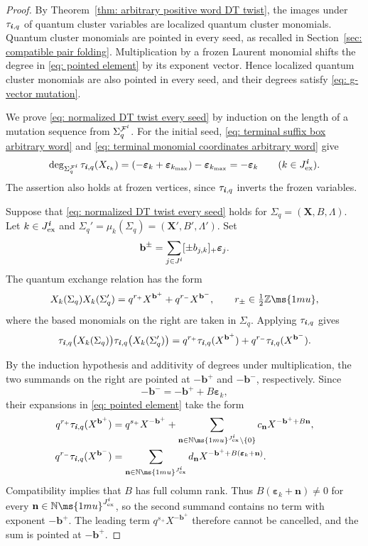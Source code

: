 \documentclass[12pt, leqno]{amsart}
\numberwithin{equation}{section}
\theoremstyle{plain}
\theoremstyle{definition}
\newcommand{\ex}{\mathrm{ex}}
\newcommand{\Z}{\mathbb{Z}\ms{1mu}}
\newcommand{\N}{\mathbb{N}\ms{1mu}}
\newcommand{\ve}{\boldsymbol{\varepsilon}}
\newcommand{\ii}{ \textbf{\textit{i}}}
\newcommand{\frakc}{\mathfrak{c}}
\newcommand{\bfX}{\mathbf{X}}
\newcommand{\bfb}{\mathbf{b}}
\newcommand{\bfn}{\mathbf{n}}
\newcommand{\calF}{\mathcal{F}}
\begin{document}
\begin{proof}
By Theorem~\ref{thm: arbitrary positive word DT twist}, the
images under $\tau_{\ii,q}$ of quantum cluster variables are
localized quantum cluster monomials.
Quantum cluster monomials are pointed in every seed, as recalled
in Section~\ref{sec: compatible pair folding}.
Multiplication by a frozen Laurent monomial shifts the degree in
\eqref{eq: pointed element} by its exponent vector.
Hence localized quantum cluster monomials are also pointed in
every seed, and their degrees satisfy \eqref{eq: g-vector mutation}.

We prove \eqref{eq: normalized DT twist every seed} by induction
on the length of a mutation sequence from $\Sigma_q^{\calF^\ii}$.
For the initial seed, \eqref{eq: terminal suffix box arbitrary word}
and \eqref{eq: terminal monomial coordinates arbitrary word} give
\[
\deg_{\Sigma_q^{\calF^\ii}}
\tau_{\ii,q}(X_{\frakc_k})
=
(-\ve_k+\ve_{k_{\max}})-\ve_{k_{\max}}
=
-\ve_k
\qquad(k\in J^\ii_\ex).
\]
The assertion also holds at frozen vertices, since
$\tau_{\ii,q}$ inverts the frozen variables.

Suppose that \eqref{eq: normalized DT twist every seed} holds
for $\Sigma_q=(\bfX,B,\Lambda)$.
Let $k\in J^\ii_\ex$ and
$\Sigma_q'=\mu_k(\Sigma_q)=(\bfX',B',\Lambda')$.
Set
\[
\bfb^\pm
=\sum_{j\in J^\ii}[\pm b_{j,k}]_+\ve_j.
\]
The quantum exchange relation has the form
\[
X_k(\Sigma_q)X_k(\Sigma_q')
=
q^{r_+}X^{\bfb^+}
+
q^{r_-}X^{\bfb^-},
\qquad
r_\pm\in\tfrac12\Z,
\]
where the based monomials on the right are taken in $\Sigma_q$.
Applying $\tau_{\ii,q}$ gives
\[
\begin{aligned}
\tau_{\ii,q}\bigl(X_k(\Sigma_q)\bigr)  \tau_{\ii,q}\bigl(X_k(\Sigma_q')\bigr) 
= q^{r_+}\tau_{\ii,q}(X^{\bfb^+}) + q^{r_-}\tau_{\ii,q}(X^{\bfb^-}).
\end{aligned}
\]

By the induction hypothesis and additivity of degrees under
multiplication, the two summands on the right are pointed at
$-\bfb^+$ and $-\bfb^-$, respectively.
Since
\[
-\bfb^-=-\bfb^++B\ve_k,
\]
their expansions in \eqref{eq: pointed element} take the form
\begin{align*}
q^{r_+}\tau_{\ii,q}(X^{\bfb^+})
&=
q^{s_+}X^{-\bfb^+}
+
\sum_{\bfn\in\N^{J^\ii_\ex}\setminus\{0\}}
c_{\bfn}X^{-\bfb^++B\bfn},\\
q^{r_-}\tau_{\ii,q}(X^{\bfb^-})
&=
\sum_{\bfn\in\N^{J^\ii_\ex}}
d_{\bfn}X^{-\bfb^++B(\ve_k+\bfn)}.
\end{align*}
Compatibility implies that $B$ has full column rank.
Thus $B(\ve_k+\bfn)\ne0$ for every
$\bfn\in\N^{J^\ii_\ex}$, so the second summand contains
no term with exponent $-\bfb^+$.
The leading term $q^{s_+}X^{-\bfb^+}$ therefore cannot
be cancelled, and the sum is pointed at $-\bfb^+$.


\end{proof}
\end{document}
